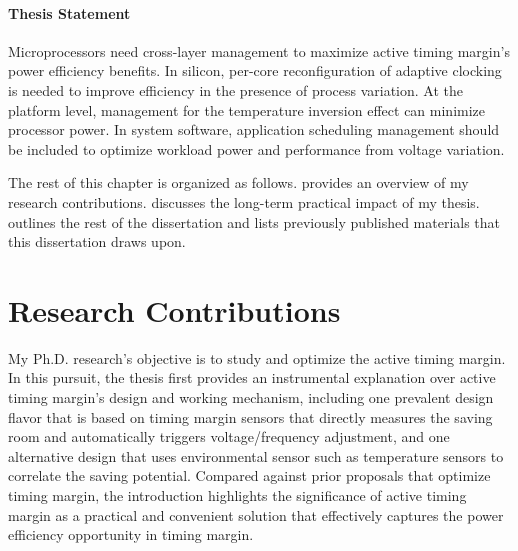 
\paragraph{Thesis Statement} Microprocessors need cross-layer management to maximize active timing margin's power efficiency benefits. In silicon, per-core reconfiguration of adaptive clocking is needed to improve efficiency in the presence of process variation. At the platform level, management for the temperature inversion effect can minimize processor power. In system software, application scheduling management should be included to optimize workload power and performance from voltage variation.

The rest of this chapter is organized as follows.  provides an overview of my research contributions.  discusses the long-term practical impact of my thesis.  outlines the rest of the dissertation and  lists previously published materials that this dissertation draws upon.

\section{Research Contributions}
\label{sec:intro:work}

My Ph.D. research's objective is to study and optimize the active timing margin. In this pursuit, the thesis first provides an instrumental explanation over active timing margin's design and working mechanism, including one prevalent design flavor that is based on timing margin sensors that directly measures the saving room and automatically triggers voltage/frequency adjustment, and one alternative design that uses environmental sensor such as temperature sensors to correlate the saving potential. Compared against prior proposals that optimize timing margin, the introduction highlights the significance of active timing margin as a practical and convenient solution that effectively captures the power efficiency opportunity in timing margin.


